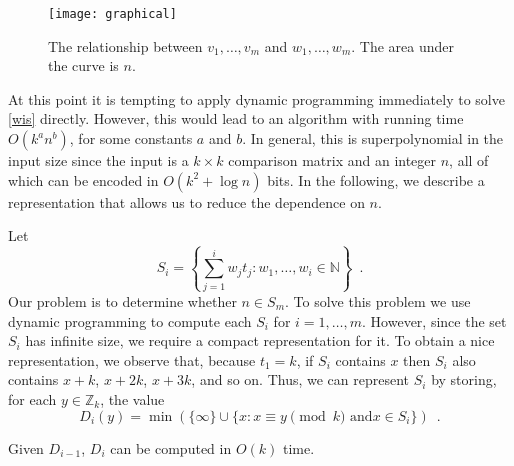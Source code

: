 \documentclass{elsart}
\newcommand{\Z}{\mathbb{Z}}
\begin{document}
\begin{figure}
\begin{center}\texttt{[image: graphical]}\end{center}
\caption{The relationship between $v_1,\ldots,v_m$ and
$w_1,\ldots,w_m$. The area under the
curve is $n$.} 
\end{figure}

At this point it is tempting to apply dynamic programming immediately
to solve \eqref{wis} directly.  However, this would lead to an
algorithm with running time $O(k^a n^b)$, for some constants $a$ and
$b$.  In general, this is superpolynomial in the input size since the
input is a $k\times k$ comparison matrix and an integer $n$, all of
which can be encoded in $O(k^2 + \log n)$ bits.  In the following, we
describe a representation that allows us to reduce the dependence
on $n$.

Let 
\[ S_i = \left\{\sum_{j=1}^i w_jt_j : 
        w_1,\ldots,w_i\in \mathbb{N} \right\} 
\enspace .
\]
Our problem is to determine whether $n\in S_m$.
To solve this problem we use dynamic programming to compute each $S_i$ for
$i=1,\ldots,m$.  However, since the set $S_i$ has infinite size, we
require a compact representation for it.  To obtain a nice
representation, we observe that, because $t_1=k$, if $S_i$ contains
$x$ then $S_i$ also contains $x+k$, $x+2k$, $x+3k$, and so on.  Thus,
we can represent $S_i$ by storing, for each $y\in \Z_k$,
the value 
\[
   D_{i}(y) = \min (\{\infty\}\cup\{x: \mbox{$x\equiv y\pmod k$ and
$x\in S_i$} \}) \enspace . 
\]
\begin{lem}
Given $D_{i-1}$, $D_i$ can be computed in $O(k)$ time.
\end{lem}
\end{document}
